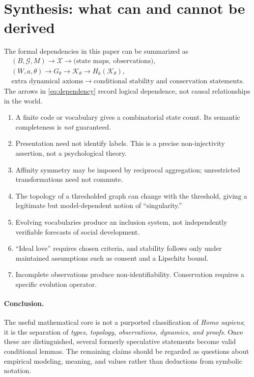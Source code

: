 \documentclass[11pt,a4paper]{article}
\numberwithin{equation}{section}
\theoremstyle{remark}
\newcommand{\G}{\mathcal{G}}
\newcommand{\X}{\mathcal{X}}
\newcommand{\K}{\mathcal{K}}
\newcommand{\1}{\mathbf{1}}
\begin{document}
\section{Synthesis: what can and cannot be derived}

The formal dependencies in this paper can be summarized as
\begin{equation}\label{eq:dependency}
\begin{gathered}
(B,\G,M)\longrightarrow\X
\longrightarrow\bigl(\text{state maps},\ \text{observations}\bigr),\\
(W,a,\theta)\longrightarrow G_\theta
\longrightarrow\K_\theta
\longrightarrow H_k(\K_\theta),\\
\text{extra dynamical axioms}\longrightarrow
\text{conditional stability and conservation statements}.
\end{gathered}
\end{equation}
The arrows in \eqref{eq:dependency} record logical dependence, not
causal relationships in the world.

\begin{enumerate}[label=\textbf{\arabic*.}]
\item A finite code or vocabulary gives a combinatorial state count.
      Its semantic completeness is \emph{not} guaranteed.
\item Presentation need not identify labels.  This is a precise
      non-injectivity assertion, not a psychological theory.
\item Affinity symmetry may be imposed by reciprocal aggregation;
      unrestricted transformations need not commute.
\item The topology of a thresholded graph can change with the
      threshold, giving a legitimate but model-dependent notion of
      ``singularity.''
\item Evolving vocabularies produce an inclusion system, not
      independently verifiable forecasts of social development.
\item ``Ideal love'' requires chosen criteria, and stability follows
      only under maintained assumptions such as consent and a
      Lipschitz bound.
\item Incomplete observations produce non-identifiability.
      Conservation requires a specific evolution operator.
\end{enumerate}

\paragraph{Conclusion.}
The useful mathematical core is not a purported classification of
\emph{Homo sapiens}; it is the separation of \emph{types, topology,
observations, dynamics, and proofs}.  Once these are distinguished,
several formerly speculative statements become valid conditional
lemmas.  The remaining claims should be regarded as questions about
empirical modeling, meaning, and values rather than deductions from
symbolic notation.
\end{document}
